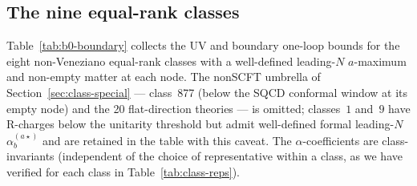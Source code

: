 \subsection{The nine equal-rank classes}
\label{sec:boundary-table}

Table~\ref{tab:b0-boundary} collects the UV and boundary one-loop
bounds for the eight non-Veneziano equal-rank classes with a
well-defined leading-$N$ $a$-maximum and non-empty matter at each
node.  The nonSCFT umbrella of Section~\ref{sec:class-special} —
class~877 (below the SQCD conformal window at its empty node) and
the 20 flat-direction theories — is omitted; classes~$1$ and~$9$
have R-charges below the unitarity threshold but admit well-defined
formal leading-$N$ $\alpha_{b}^{(a\star)}$ and are retained in the
table with this caveat.  The
$\alpha$-coefficients are class-invariants (independent of the choice
of representative within a class, as we have verified for each
class in Table~\ref{tab:class-reps}).

